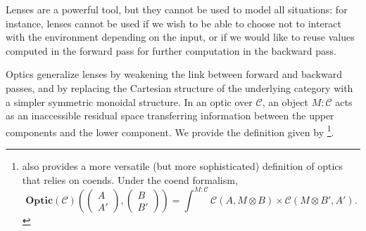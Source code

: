 \documentclass[11pt,a4paper,openright,twoside]{report}
\theoremstyle{plain}
\theoremstyle{definition}
\begin{document}
Lenses are a powerful tool, but they cannot be used to model all situations: for instance, lenses cannot be used if we wish to be able to choose not to interact with the environment depending on the input, or if we would like to reuse values computed in the forward pass for further computation in the backward pass.

Optics generalize lenses by weakening the link between forward and backward passes, and by replacing the Cartesian structure of the underlying category with a simpler symmetric monoidal structure. In an optic over $\mathcal{C}$, an object $M : \mathcal{C}$ acts as an inaccessible residual space transferring information between the upper components and the lower component.
We provide the definition given by \cite{riley2018categories}\footnote{\cite{riley2018categories}also provides a more versatile (but more sophisticated) definition of optics that relies on coends. Under the coend formalism,
\[\mathbf{Optic}(\mathcal{C})\left(\left(\begin{smallmatrix} A \\ A' \end{smallmatrix}\right),\left(\begin{smallmatrix} B \\ B' \end{smallmatrix}\right)\right) = \int^{M : \mathcal{C}}\mathcal{C}(A,M \otimes B) \times \mathcal{C}(M \otimes B',A').\]}.
\end{document}

